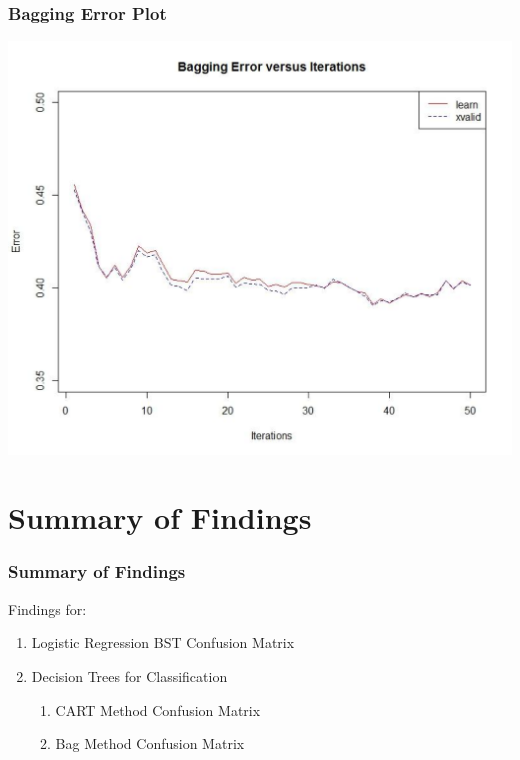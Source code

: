 \documentclass{beamer}
\begin{document}
\begin{frame}
\frametitle{Bagging Error Plot}
\begin{center} 
\includegraphics[width=.6 \textwidth]{bagErr}
\end{center}
\end{frame}



\section{Summary of Findings}
\begin{frame}
\frametitle{Summary of Findings}
Findings for: 
\begin{enumerate}
\item Logistic Regression BST Confusion Matrix
\item Decision Trees for Classification
\begin{enumerate}
\item CART Method Confusion Matrix
\item Bag Method Confusion Matrix
\end{enumerate}
\end{enumerate}
\end{frame}
\end{document}
